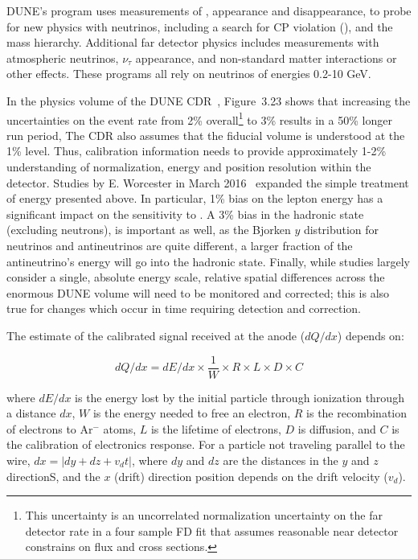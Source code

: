 DUNE's  program %
uses measurements of %
\nue, \anue appearance and \numu %
disappearance, to probe for new physics with neutrinos, including a search for CP violation (), and the mass hierarchy. Additional far detector physics includes measurements with atmospheric neutrinos, $\nu_\tau$ appearance, and non-standard matter  interactions or other effects. These programs all
rely on neutrinos of energies 0.2-10 GeV. 

In the physics volume of the DUNE CDR~\cite{cdr-2}, Figure~3.23 shows that increasing the uncertainties on the \nue event rate from 
\num{2}\% overall\footnote{This uncertainty is an uncorrelated normalization uncertainty on the far detector \nue rate in a four sample FD fit that assumes reasonable near detector constrains on flux and cross sections.} to \num{3}\% results in a \num{50}\% longer run period, 
The CDR also assumes that the fiducial volume is understood at the 1\% level. Thus, calibration information needs to provide approximately 1-2\% understanding of normalization, energy and position resolution within the detector. Studies by E. Worcester
 in March 2016~\cite{ebias} expanded the simple treatment of energy  presented above. In particular, \num{1}\% bias on the lepton energy has a significant impact on the sensitivity to . A \num{3}\% bias in the hadronic state (excluding neutrons), is important as well, as the Bjorken $y$ distribution for neutrinos and antineutrinos are quite different, a larger fraction of the  antineutrino's energy will go into the hadronic state.  Finally, while studies largely consider a single, absolute energy scale, relative spatial differences across the enormous DUNE  volume will need to be monitored and corrected; this is also true for changes which occur in time requiring detection and correction.

The estimate of the calibrated signal received at the anode ($dQ/dx$) depends on:

\begin{equation}
dQ/dx = dE/dx \times \frac{1}{W} \times R \times L \times D \times C
\end{equation}

where $dE/dx$ is the energy lost by the initial particle through ionization through a distance $dx$, $W$ is the energy needed to free an electron, $R$ is the recombination of electrons to Ar${^-}$ atoms, $L$ is the lifetime of electrons, $D$ is diffusion, and $C$ is the calibration of electronics response. For a particle not traveling parallel to the wire, $dx = |dy+dz+v_d t|$, where $dy$ and $dz$ are the distances in the $y$ and $z$ directionS, and the $x$ (drift) direction position depends on the drift velocity ($v_d$).

